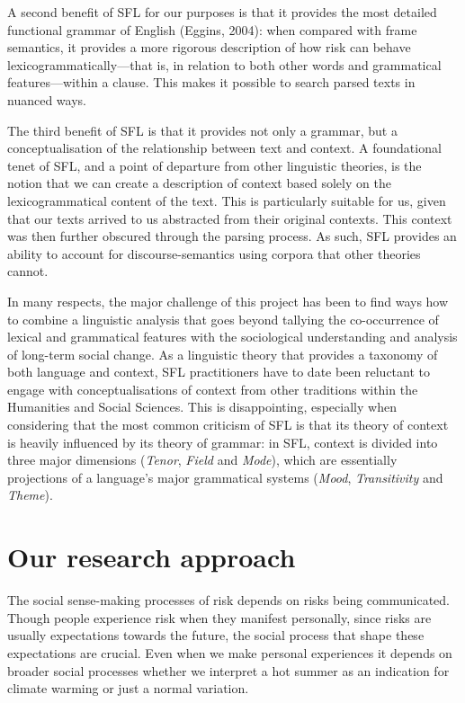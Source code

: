 A second benefit of SFL for our purposes is that it provides the most detailed functional grammar of English (Eggins, 2004): when compared with frame semantics, it provides a more rigorous description of how risk can behave lexicogrammatically---that is, in relation to both other words and grammatical features---within a clause. This makes it possible to search parsed texts in nuanced ways.

The third benefit of SFL is that it provides not only a grammar, but a conceptualisation of the relationship between text and context. A foundational tenet of SFL, and a point of departure from other linguistic theories, is the notion that we can create a description of context based solely on the lexicogrammatical content of the text. This is particularly suitable for us, given that our texts arrived to us abstracted from their original contexts. This context was then further obscured through the parsing process. As such, SFL provides an ability to account for discourse-semantics using corpora that other theories cannot.

In many respects, the major challenge of this project has been to find ways how to combine a linguistic analysis that goes beyond tallying the co-occurrence of lexical and grammatical features with the sociological understanding and analysis of long-term social change. As a linguistic theory that provides a taxonomy of both language and context, SFL practitioners have to date been reluctant to engage with conceptualisations of context from other traditions within the Humanities and Social Sciences. This is disappointing, especially when considering that the most common criticism of SFL is that its theory of context is heavily influenced by its theory of grammar: in SFL, context is divided into three major dimensions (\emph{Tenor}, \emph{Field} and \emph{Mode}), which are essentially projections of a language's major grammatical systems (\emph{Mood}, \emph{Transitivity} and \emph{Theme}).

\section{Our research approach}

The social sense-making processes of risk depends on risks being communicated. Though people experience risk when they manifest personally, since risks are usually expectations towards the future, the social process that shape these expectations are crucial. Even when we make personal experiences it depends on broader social processes whether we interpret a hot summer as an indication for climate warming or just a normal variation.

